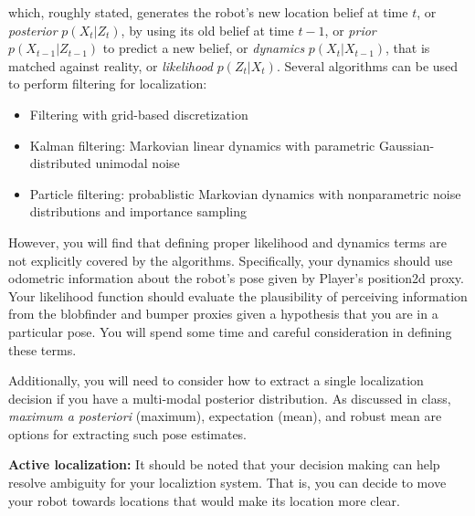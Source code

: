 which, roughly stated, generates the robot's new location belief at time $t$, or {\it posterior} $p(X_{t}|Z_{t})$, by using its old belief at time $t-1$, or {\it prior} $p(X_{t-1}|Z_{t-1})$ to predict a new belief, or {\it dynamics} $p(X_{t}|X_{t-1})$, that is matched against reality, or {\it likelihood} $p(Z_{t}|X_{t})$.  Several algorithms can be used to perform filtering for localization:

\begin{itemize}
\item Filtering with grid-based discretization
\item Kalman filtering: Markovian linear dynamics with parametric Gaussian-distributed unimodal noise 
\item Particle filtering: probablistic Markovian dynamics with nonparametric noise distributions and importance sampling
\end{itemize}

However, you will find that defining proper likelihood and dynamics terms are not explicitly covered by the algorithms.  Specifically, your dynamics should use odometric information about the robot's pose given by Player's position2d proxy.  Your likelihood function should evaluate the plausibility of perceiving information from the blobfinder and bumper proxies given a hypothesis that you are in a particular pose.  You will spend some time and careful consideration in defining these terms.  

Additionally, you will need to consider how to extract a single localization decision if you have a multi-modal posterior distribution.  As discussed in class, {\it maximum a posteriori} (maximum), expectation (mean), and robust mean are options for extracting such pose estimates.

{\bf Active localization:} It should be noted that your decision making can help resolve ambiguity for your localiztion system.  That is, you can decide to move your robot towards locations that would make its location more clear.

